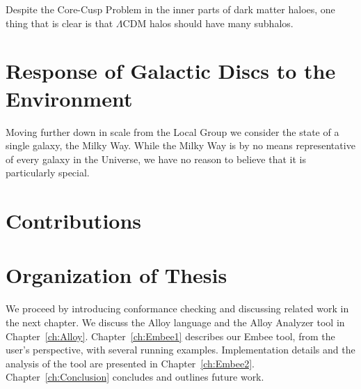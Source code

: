 Despite the Core-Cusp Problem in the inner parts of dark matter haloes, one thing that is clear is that $\Lambda$CDM halos should have many subhalos.


\section{Response of Galactic Discs to the Environment}

Moving further down in scale from the Local Group we consider the state of a single galaxy, the Milky Way. While the Milky Way is by no means representative of every galaxy in the Universe, we have no reason to believe that it is particularly special. 


\section{Contributions}


\section{Organization of Thesis}

We proceed by introducing conformance checking and discussing related work in the next
chapter. We discuss the Alloy language and the Alloy Analyzer tool in
Chapter~\ref{ch:Alloy}.  Chapter~\ref{ch:Embee1} describes our Embee tool, from the
user's perspective, with several running examples.  Implementation details and the
analysis of the tool are presented in Chapter~\ref{ch:Embee2}.
Chapter~\ref{ch:Conclusion} concludes and outlines future work.


